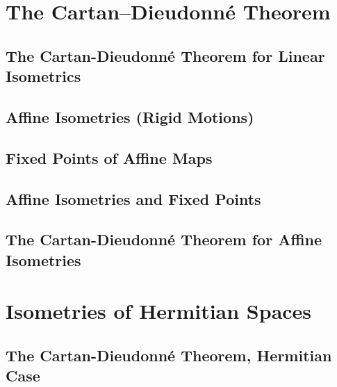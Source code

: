 \documentclass[a4paper]{article}
\begin{document}
\section{The Cartan–Dieudonné Theorem}
\subsection{ The Cartan-Dieudonné Theorem for Linear Isometrics} %

\subsection{ Affine Isometries (Rigid Motions)} %

\subsection{ Fixed Points of Affine Maps} %

\subsection{ Affine Isometries and Fixed Points} %

\subsection{ The Cartan-Dieudonné Theorem for Affine Isometries} %


\newpage
\section{Isometries of Hermitian Spaces}
\subsection{ The Cartan-Dieudonné Theorem, Hermitian Case} %
\end{document}
